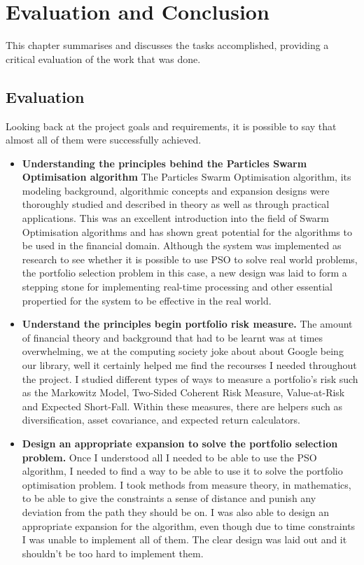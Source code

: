 \chapter{Evaluation and Conclusion}
This chapter summarises and discusses the tasks accomplished, providing a critical evaluation of the work that was done.

  \section{Evaluation} %
  \label{sec:evaluation}
  Looking back at the project goals and requirements, it is possible to say that almost all of them were successfully achieved. 
  \begin{itemize}
    \item \textbf{Understanding the principles behind the Particles Swarm Optimisation algorithm} The Particles Swarm Optimisation algorithm, its modeling background, algorithmic concepts and expansion designs were thoroughly studied and described in theory as well as through practical applications. This was an excellent introduction into the field of Swarm Optimisation algorithms and has shown great potential for the algorithms to be used in the financial domain. Although the system was implemented as research to see whether it is possible to use PSO to solve real world problems, the portfolio selection problem in this case, a new design was laid to form a stepping stone for implementing real-time processing and other essential propertied for the system to be effective in the real world.
    \item \textbf{Understand the principles begin portfolio risk measure.} The amount of financial theory and background that had to be learnt was at times overwhelming, we at the computing society joke about about Google being our library, well  it certainly helped me find the recourses I needed throughout the project. I studied different types of ways to measure a portfolio's risk such as the Markowitz Model, Two-Sided Coherent Risk Measure, Value-at-Risk and Expected Short-Fall. Within these measures, there are helpers such as diversification, asset covariance, and expected return calculators. 
    \item \textbf{Design an appropriate expansion to solve the portfolio selection problem.} Once I understood all I needed to be able to use the PSO algorithm, I needed to find a way to be able to use it to solve the portfolio optimisation problem. I took methods from measure theory, in mathematics, to be able to give the constraints a sense of distance and punish any deviation from the path they should be on. I was also able to design an appropriate expansion for the algorithm, even though due to time constraints I was unable to implement all of them. The clear design was laid out and it shouldn't be too hard to implement them.

\end{itemize}
